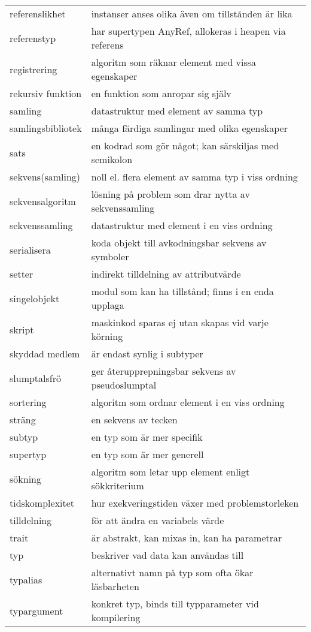 \begin{tabular}{l|l}
referenslikhet & instanser anses olika även om tillstånden är lika \\
referenstyp & har supertypen AnyRef, allokeras i heapen via referens \\
registrering & algoritm som räknar element med vissa egenskaper \\
rekursiv funktion & en funktion som anropar sig själv \\
samling & datastruktur med element av samma typ \\
samlingsbibliotek & många färdiga samlingar med olika egenskaper \\
sats & en kodrad som gör något; kan särskiljas med semikolon \\
sekvens(samling) & noll el. flera element av samma typ i viss ordning \\
sekvensalgoritm & lösning på problem som drar nytta av sekvenssamling \\
sekvenssamling & datastruktur med element i en viss ordning \\
serialisera & koda objekt till avkodningsbar sekvens av symboler \\
setter & indirekt tilldelning av attributvärde \\
singelobjekt & modul som kan ha tillstånd; finns i en enda upplaga \\
skript & maskinkod sparas ej utan skapas vid varje körning \\
skyddad medlem & är endast synlig i subtyper \\
slumptalsfrö & ger återupprepningsbar sekvens av pseudoslumptal \\
sortering & algoritm som ordnar element i en viss ordning \\
sträng & en sekvens av tecken \\
subtyp & en typ som är mer specifik \\
supertyp & en typ som är mer generell \\
sökning & algoritm som letar upp element enligt sökkriterium \\
tidskomplexitet & hur exekveringstiden växer med problemstorleken \\
tilldelning & för att ändra en variabels värde \\
trait & är abstrakt, kan mixas in, kan ha parametrar \\
typ & beskriver vad data kan användas till \\
typalias & alternativt namn på typ som ofta ökar läsbarheten \\
typargument & konkret typ, binds till typparameter vid kompilering \\

\end{tabular}
